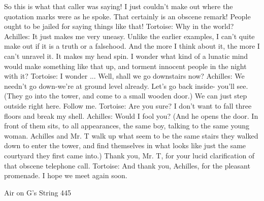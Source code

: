       So this is what that caller was saying! I just couldn't make out where the quotation
      marks were as he spoke. That certainly is an obscene remark! People ought to be
      jailed for saying things like that!
  Tortoise: Why in the world?
  Achilles: It just makes me very uneasy. Unlike the earlier examples, I can't quite make
      out if it is a truth or a falsehood. And the more I think about it, the more I can't
      unravel it. It makes my head spin. I wonder what kind of a lunatic mind would
      make something like that up, and torment innocent people in the night with it?
  Tortoise: I wonder ... Well, shall we go downstairs now?
  Achilles: We needn't go down-we're at ground level already. Let's go back inside-
      you'll see. (They go into the tower, and come to a small wooden door.) We can just
      step outside right here. Follow me.
  Tortoise: Are you sure? I don't want to fall three floors and break my shell.
  Achilles: Would I fool you?
      (And he opens the door. In front of them sits, to all appearances, the same boy,
      talking to the same young woman. Achilles and Mr. T walk up what seem to be the
      same stairs they walked down to enter the tower, and find themselves in what looks
      like      just     the     same      courtyard      they     first   came      into.)
      Thank you, Mr. T, for your lucid clarification of that obscene telephone call.
Tortoise: And thank you, Achilles, for the pleasant promenade. I hope we meet again
      soon.




Air on G's String                                                                       445


